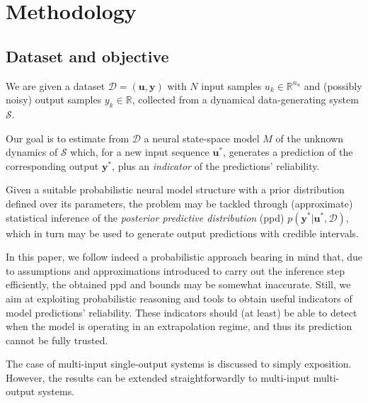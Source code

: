 \documentclass{ifacconf}
\newcommand{\nin}{{n_u}}
\newcommand{\nsamp}{N}
\newcommand{\tvec}[1]{{\mathbf{#1}}}
\newcommand{\D}{\mathcal{D}} %
\begin{document}
\section{Methodology}
\subsection{Dataset and objective}
We are given a dataset $\D=(\tvec{u}, \tvec{y})$ with $\nsamp$ input samples $u_k \in \mathbb{R}^{\nin}$ and (possibly noisy) output samples $y_k \in \mathbb{R}$, collected from a dynamical data-generating system $\mathcal{S}$. 

Our goal is to estimate from $\D$ a neural state-space model $M$ of the unknown dynamics of $\mathcal{S}$ which, for a new input sequence $\tvec{u}^*$, generates a prediction of the corresponding output ${\tvec{y}}^*$, plus an \emph{indicator} of the predictions' reliability. 

Given a suitable probabilistic neural model structure with a prior distribution defined over its parameters, the problem may be tackled through (approximate) statistical inference of the \emph{posterior predictive distribution}  (ppd) $p(\tvec{y}^* | \tvec{u}^*, \D)$, which in turn may be used to generate output predictions with credible intervals. 

In this paper, we follow indeed a probabilistic approach bearing in mind that, due to assumptions and approximations introduced to carry out the inference step efficiently, the obtained ppd and bounds may be somewhat inaccurate. Still, we aim at exploiting probabilistic reasoning and tools to obtain  useful
indicators of model predictions' reliability. These indicators should (at least) be able to detect when the model is operating in an extrapolation
regime, and thus its prediction cannot be fully trusted.

The case of multi-input single-output systems is discussed to simply exposition. However, the results can be extended straightforwardly to multi-input multi-output systems. 
\end{document}

